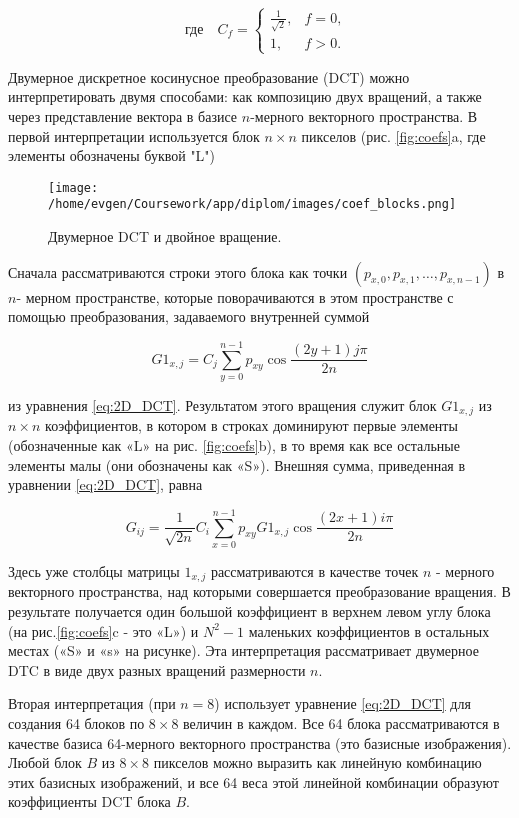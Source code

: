 $$
\quad \text{где} \quad C_f = 
\left\{
    \begin{array}{ll}
        \frac{1}{\sqrt{2}}, & f = 0, \\
        1, & f > 0. 
    \end{array}
\right.
$$


Двумерное дискретное косинусное преобразование (DCT) можно интерпретировать двумя способами: как композицию двух вращений, 
а также через представление вектора в базисе $n$-мерного векторного пространства. 
В первой ин­терпретации используется блок $n \times n$ пикселов (рис. \eqref{fig:coefs}a, где элементы обозначены буквой "L")


\begin{figure}[h!]
    \centering
    \texttt{[image: /home/evgen/Coursework/app/diplom/images/coef\_blocks.png]}
    \caption{Двумерное DCT и двойное вращение.}
    \label{fig:coefs}
\end{figure}


Сначала рассматриваются строки этого блока как точки $(p_{x,0}, p_{x,1}, \dots, p_{x,n-1})$ в $n$- мерном пространстве,
которые поворачиваются в этом пространстве с помощью преобразования, задаваемого внутренней суммой

$$
G1_{x,j} = C_j \sum_{y=0}^{n-1} p_{xy} \cos{\frac{(2y+1)j \pi}{2n}}
$$


из уравнения \eqref{eq:2D_DCT}. Результатом этого вращения служит блок $G1_{x,j}$ из $n \times n$ коэффициентов, 
в котором в строках доминируют первые элементы (обозначенные как «L» на рис. \eqref{fig:coefs}b), 
в то время как все остальные элементы малы (они обозначены как «S»). Внешняя сумма, приведенная в уравнении \eqref{eq:2D_DCT}, равна


$$
G_{ij} = \frac{1}{\sqrt{2n}} C_i \sum_{x=0}^{n-1} p_{xy} G1_{x,j} \cos{\frac{(2x+1)i \pi}{2n}}
$$

Здесь уже столбцы матрицы $1_{x,j}$ рассматриваются в качестве то­чек $n$ - мерного векторного пространства, над которыми совершает­ся преобразование вращения. 
В результате получается один боль­шой коэффициент в верхнем левом углу блока (на рис.\eqref{fig:coefs}c - это «L») 
и $N^2 - 1$ маленьких коэффициентов в остальных местах («S» и «s» на рисунке). 
Эта интерпретация рассматривает двумерное DTC в виде двух разных вращений размерности $n$. 


Вторая интерпретация (при $n = 8$) использует уравнение \eqref{eq:2D_DCT} для создания 64 блоков по $8 \times 8$ величин в каждом. 
Все 64 блока рас­сматриваются в качестве базиса 64-мерного векторного простран­ства (это базисные изображения). 
Любой блок $B$ из $8 \times 8$ пикселов можно выразить как линейную комбинацию этих базисных изобра­жений, 
и все 64 веса этой линейной комбинации образуют коэффи­циенты DCT блока $B$.


